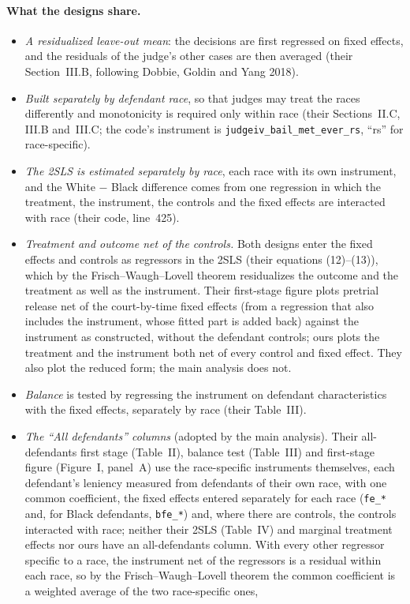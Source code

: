\documentclass[11pt]{article}
\begin{document}
\paragraph{What the designs share.}
\begin{itemize}
  \item \emph{A residualized leave-out mean}: the decisions are first regressed on fixed effects, and the residuals of the judge's other cases are then averaged (their Section~III.B, following Dobbie, Goldin and Yang 2018).
  \item \emph{Built separately by defendant race}, so that judges may treat the races differently and monotonicity is required only within race (their Sections~II.C, III.B and~III.C; the code's instrument is \texttt{judgeiv\_\allowbreak bail\_\allowbreak met\_\allowbreak ever\_\allowbreak rs}, ``rs'' for race-specific).
  \item \emph{The 2SLS is estimated separately by race}, each race with its own instrument, and the White $-$ Black difference comes from one regression in which the treatment, the instrument, the controls and the fixed effects are interacted with race (their code, line~425).
  \item \emph{Treatment and outcome net of the controls.} Both designs enter the fixed effects and controls as regressors in the 2SLS (their equations (12)--(13)), which by the Frisch--Waugh--Lovell theorem residualizes the outcome and the treatment as well as the instrument. Their first-stage figure plots pretrial release net of the court-by-time fixed effects (from a regression that also includes the instrument, whose fitted part is added back) against the instrument as constructed, without the defendant controls; ours plots the treatment and the instrument both net of every control and fixed effect. They also plot the reduced form; the main analysis does not.
  \item \emph{Balance} is tested by regressing the instrument on defendant characteristics with the fixed effects, separately by race (their Table~III).
  \item \emph{The ``All defendants'' columns} (adopted by the main analysis). Their all-defendants first stage (Table~II), balance test (Table~III) and first-stage figure (Figure~I, panel~A) use the race-specific instruments themselves, each defendant's leniency measured from defendants of their own race, with one common coefficient, the fixed effects entered separately for each race (\texttt{fe\_*} and, for Black defendants, \texttt{bfe\_*}) and, where there are controls, the controls interacted with race; neither their 2SLS (Table~IV) and marginal treatment effects nor ours have an all-defendants column. With every other regressor specific to a race, the instrument net of the regressors is a residual within each race, so by the Frisch--Waugh--Lovell theorem the common coefficient is a weighted average of the two race-specific ones,

\end{itemize}
\end{document}
